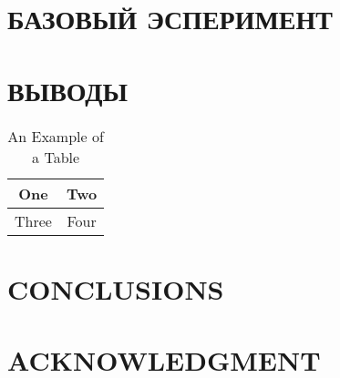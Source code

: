 \documentclass[letterpaper, 10 pt, conference]{ieeeconf}  %
\begin{document}
\section{БАЗОВЫЙ ЭСПЕРИМЕНТ}




\section{ВЫВОДЫ}







\begin{table}[h]
\caption{An Example of a Table}
\label{table_example}
\begin{center}
\begin{tabular}{|c||c|}
\hline
One & Two\\
\hline
Three & Four\\
\hline
\end{tabular}
\end{center}
\end{table}


  



\section{CONCLUSIONS}


\addtolength{\textheight}{-12cm}   %








\section*{ACKNOWLEDGMENT}
\end{document}
